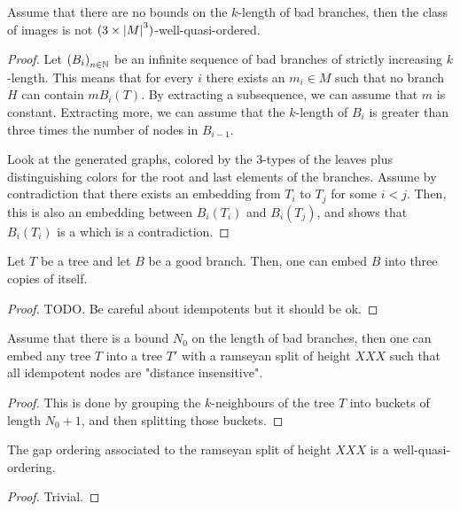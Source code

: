 \begin{lemma}
    Assume that there are no bounds on the $k$-length of bad branches, then 
    the class of images is not $(3 \times \left| M \right|^3)$-well-quasi-ordered.
\end{lemma}
\begin{proof}
    Let $\seqof{B_i}$ be an infinite sequence of bad branches of strictly increasing $k$-length.
    This means that for every $i$ there exists an $m_i \in M$ such that
    no branch $H$ can contain $m B_i(T)$. By extracting a subsequence, we can assume that $m$ is constant.
    Extracting more, we can assume that the $k$-length of $B_i$ is greater than three times the
    number of nodes in $B_{i-1}$.

    Look at the generated graphs, colored by the $3$-types of the leaves plus
    distinguishing colors for the root and last elements of the branches. Assume by contradiction that
    there exists an embedding from $T_i$ to $T_j$ for some $i < j$. Then,
    this is also an embedding between $B_i(T_i)$ and $B_i(T_j)$, and
    shows that $B_i(T_i)$ is a  which is a contradiction.
\end{proof}

\begin{lemma}
    Let $T$ be a tree and let $B$ be a good branch. Then, one can embed     
    $B$ into three copies of itself.
\end{lemma}
\begin{proof}
    TODO. Be careful about idempotents but it should be ok.
\end{proof}

\begin{lemma}
    Assume that there is a bound $N_0$ on the length of bad branches, then
    one can embed any tree $T$ into a tree $T'$ with a ramseyan split of height $XXX$
    such that all idempotent nodes are "distance insensitive".
\end{lemma}
\begin{proof}
    This is done by grouping the $k$-neighbours of the tree $T$ into buckets of length $N_0 + 1$, and then
    splitting those buckets. 
\end{proof}

\begin{lemma}
    The gap ordering associated to the ramseyan split of height $XXX$ is a well-quasi-ordering.
\end{lemma}
\begin{proof}
    Trivial.
\end{proof}

